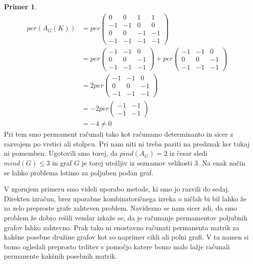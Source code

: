 \documentclass[12pt,a4paper,twoside]{article}
\theoremstyle{definition} %
\newtheorem{primer}[definicija]{Primer}
\theoremstyle{plain} %
\numberwithin{equation}{section}  %
\begin{document}
\begin{primer}
\begin{equation*}
\begin{split}
per(A_G(K)) &= per \left( \begin{matrix} 0 & 0 & 1 & 1 \\ -1 & -1 & 0 & 0 \\ 0 & 0 & -1 & -1 \\ -1 & -1 & -1 & -1 \end{matrix} \right) \\
&= per\left( \begin{matrix} -1 & -1 & 0 \\ 0 & 0 & -1 \\ -1 & -1 & -1 \end{matrix} \right) + per \left( \begin{matrix} -1 & -1 & 0 \\ 0 & 0 & -1 \\ -1 & -1 & -1 \end{matrix} \right) \\
&= 2 per\left( \begin{matrix} -1 & -1 & 0 \\ 0 & 0 & -1 \\ -1 & -1 & -1 \end{matrix} \right) \\
& =-2 per \left( \begin{matrix} -1 & -1 \\ -1 & -1 \end{matrix} \right) \\
&=-4 \neq 0
\end{split}
\end{equation*}
Pri tem smo permament računali tako kot računamo determinanto in sicer z razvojem po vrstici ali stolpcu. Pri nam niti ni treba paziti na predznak ker tukaj ni pomemben. Ugotovili smo torej, da $pind(A_G) = 2$ iz česar sledi $mind(G) \le 3$ in graf $G$ je torej utežljiv iz seznamov velikosti $3$. Na enak način se lahko problema lotimo za poljuben podan graf.
\end{primer}
V zgornjem primeru smo videli uporabo metode, ki smo jo razvili do sedaj. Direkten izračun, brez uporabne kombinatoričnega izreka o ničlah bi bil lahko že za zelo preproste grafe zahteven problem. Navidezno se nam sicer zdi, da smo problem že dobro rešili vendar izkaže se, da je računanje permamentov poljubnih grafov lahko zahtevno. Prak tako ni enostavno računati permanenta matrik za kakšne posebne družine grafov kot so naprimer cikli ali polni grafi. V ta namen si bomo ogledali preprosto trditev s pomočjo katere bomo malo lažje računali permanente kakšnih posebnih matrik.
\end{document}
